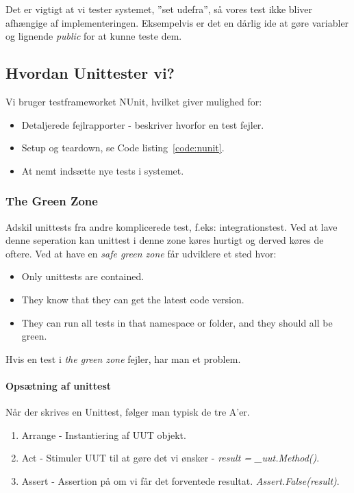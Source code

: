 Det er vigtigt at vi tester systemet, ''set udefra'', så vores test ikke bliver afhængige af implementeringen. Eksempelvis er det en dårlig ide at gøre variabler og lignende \textit{public} for at kunne teste dem.

\subsection{Hvordan Unittester vi?}
Vi bruger testframeworket NUnit, hvilket giver mulighed for:

\begin{itemize}
	\item Detaljerede fejlrapporter - beskriver hvorfor en test fejler.
	\item Setup og teardown, se Code listing~\ref{code:nunit}.
	\item At nemt indsætte nye tests i systemet.
\end{itemize}

\subsubsection{The Green Zone}
Adskil unittests fra andre komplicerede test, f.eks: integrationstest. Ved at lave denne seperation kan unittest i denne zone køres hurtigt og derved køres de oftere. Ved at have en \textit{safe \textcolor{green!80!black}{green} zone} får udviklere et sted hvor:

\begin{itemize}
	\item Only unittests are contained.
	\item They know that they can get the latest code version.
	\item They can run all tests in that namespace or folder, and they should all be green.
\end{itemize}

Hvis en test i \textit{the green zone} fejler, har man et problem.

\paragraph{Opsætning af unittest} Når der skrives en Unittest, følger man typisk de tre A'er.

\begin{enumerate}
	\item Arrange - Instantiering af UUT objekt.
	\item Act - Stimuler UUT til at gøre det vi ønsker - \textit{result = \_uut.Method()}.
	\item Assert - Assertion på om vi får det forventede resultat. \textit{Assert.False(result)}.
\end{enumerate}

